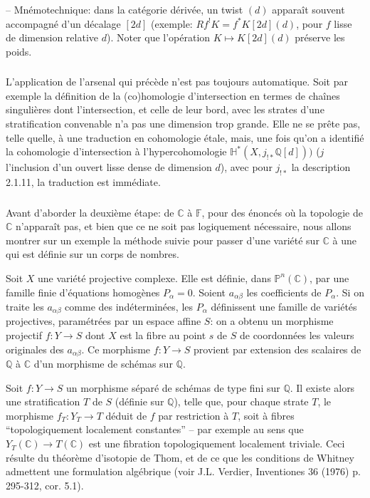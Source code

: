 \documentclass[12pt,a4paper]{article}
\theoremstyle{plain}
\theoremstyle{definition}
\theoremstyle{remark}
\newcommand{\CC}{\mathbb{C}}
\newcommand{\FF}{\mathbb{F}}
\newcommand{\HH}{\mathbb{H}}
\newcommand{\PP}{\mathbb{P}}
\newcommand{\QQ}{\mathbb{Q}}
\begin{document}
-- Mn\'emotechnique: dans la cat\'egorie d\'eriv\'ee, un twist $(d)$ appara\^it souvent accompagn\'e d'un d\'ecalage $[2d]$ (exemple: $Rf^!K = f^*K[2d](d)$, pour $f$ lisse de dimension relative $d$). Noter que l'op\'eration $K \longmapsto K[2d](d)$ pr\'eserve les poids.

\subsubsection{}
L'application de l'arsenal qui pr\'ec\`ede n'est pas toujours automatique. Soit par exemple la d\'efinition de la (co)homologie d'intersection en termes de cha\^ines singuli\`eres dont l'intersection, et celle de leur bord, avec les strates d'une stratification convenable n'a pas une dimension trop grande. Elle ne se pr\^ete pas, telle quelle, \`a une traduction en cohomologie \'etale, mais, une fois qu'on a identifi\'e la cohomologie d'intersection \`a l'hypercohomologie $\HH^*(X, j_{!*}\QQ[d]))$ ($j$ l'inclusion d'un ouvert lisse dense de dimension $d$), avec pour $j_{!*}$ la description 2.1.11, la traduction est imm\'ediate.

\subsubsection{}
Avant d'aborder la deuxi\`eme \'etape: de $\CC$ \`a $\FF$, pour des \'enonc\'es o\`u la topologie de $\CC$ n'appara\^it pas, et bien que ce ne soit pas logiquement n\'ecessaire, nous allons montrer sur un exemple la m\'ethode suivie pour passer d'une vari\'et\'e sur $\CC$ \`a une qui est d\'efinie sur un corps de nombres.

Soit $X$ une vari\'et\'e projective complexe. Elle est d\'efinie, dans $\PP^n(\CC)$, par une famille finie d'\'equations homog\`enes $P_{\alpha} = 0$. Soient $a_{\alpha\beta}$ les coefficients de $P_{\alpha}$. Si on traite les $a_{\alpha\beta}$ comme des ind\'etermin\'ees, les $P_{\alpha}$ d\'efinissent une famille de vari\'et\'es projectives, param\'etr\'ees par un espace affine $S$: on a obtenu un morphisme projectif $f: Y \to S$ dont $X$ est la fibre au point $s$ de $S$ de coordonn\'ees les valeurs originales des $a_{\alpha\beta}$. Ce morphisme $f: Y \to S$ provient par extension des scalaires de $\QQ$ \`a $\CC$ d'un morphisme de sch\'emas sur $\QQ$.

Soit $f: Y \to S$ un morphisme s\'epar\'e de sch\'emas de type fini sur $\QQ$. Il existe alors une stratification $T$ de $S$ (d\'efinie sur $\QQ$), telle que, pour chaque strate $T$, le morphisme $f_T: Y_T \to T$ d\'eduit de $f$ par restriction \`a $T$, soit \`a fibres ``topologiquement localement constantes'' -- par exemple au sens que $Y_T(\CC) \to T(\CC)$ est une fibration topologiquement localement triviale. Ceci r\'esulte du th\'eor\`eme d'isotopie de Thom, et de ce que les conditions de Whitney admettent une formulation alg\'ebrique (voir J.L. Verdier, Inventiones 36 (1976) p. 295-312, cor. 5.1).
\end{document}
